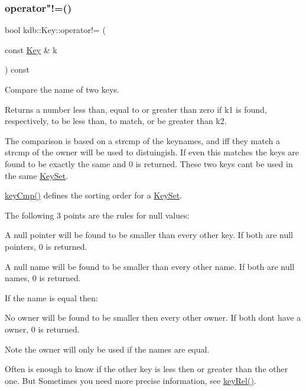 \subsubsection{\texorpdfstring{operator"!=()}{operator!=()}}
{\footnotesize\ttfamily bool kdb\+::\+Key\+::operator!= (\begin{DoxyParamCaption}\item[{const \hyperlink{classkdb_1_1Key}{Key} \&}]{k }\end{DoxyParamCaption}) const\hspace{0.3cm}{\ttfamily [inline]}}



Compare the name of two keys. 

\begin{DoxyReturn}{Returns}
a number less than, equal to or greater than zero if k1 is found, respectively, to be less than, to match, or be greater than k2.
\end{DoxyReturn}
The comparison is based on a strcmp of the keynames, and iff they match a strcmp of the owner will be used to distuingish. If even this matches the keys are found to be exactly the same and 0 is returned. These two keys can\textquotesingle{}t be used in the same \hyperlink{classkdb_1_1KeySet}{Key\+Set}.

\hyperlink{group__keytest_gaf6e66e12fe04d535a5d1c8218ced803e}{key\+Cmp()} defines the sorting order for a \hyperlink{classkdb_1_1KeySet}{Key\+Set}.

The following 3 points are the rules for null values\+:


\begin{DoxyItemize}
\item A null pointer will be found to be smaller than every other key. If both are null pointers, 0 is returned.
\item A null name will be found to be smaller than every other name. If both are null names, 0 is returned.
\end{DoxyItemize}

If the name is equal then\+:


\begin{DoxyItemize}
\item No owner will be found to be smaller then every other owner. If both don\textquotesingle{}t have a owner, 0 is returned.
\end{DoxyItemize}

\begin{DoxyNote}{Note}
the owner will only be used if the names are equal.
\end{DoxyNote}
Often is enough to know if the other key is less then or greater than the other one. But Sometimes you need more precise information, see \hyperlink{group__keytest_ga6bb0f95ac34ce9c42d61bb35a76139d0}{key\+Rel()}.

